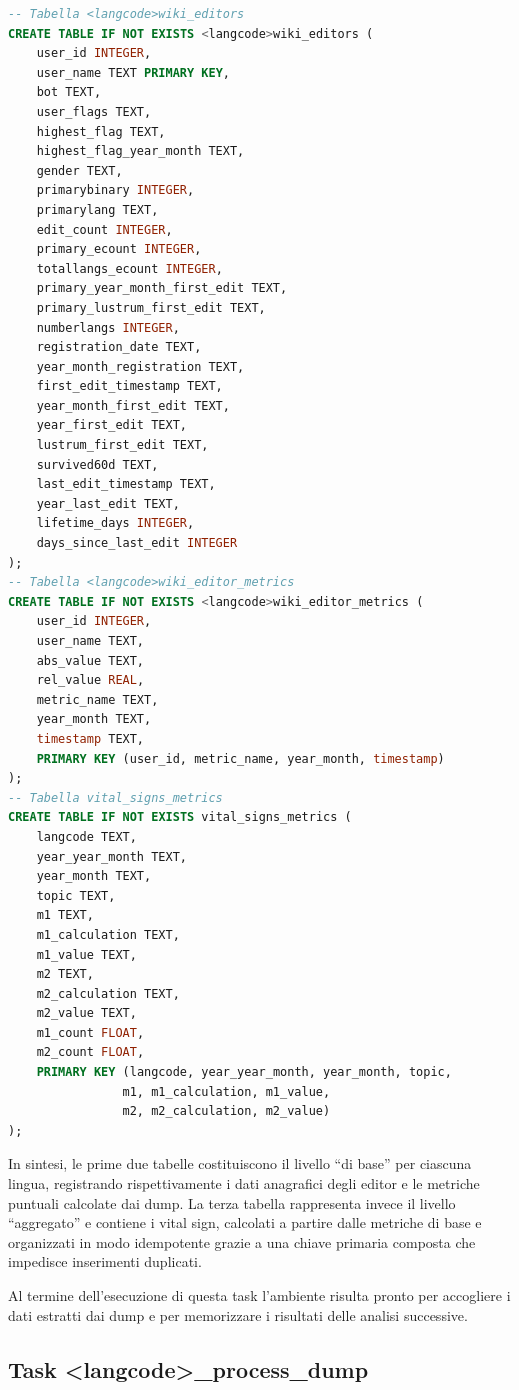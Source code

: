 \begin{lstlisting}[language=SQL, caption={Definizione delle tabelle create dalla task create\_dbs}, label=lst:create_dbs_tables, basicstyle=\scriptsize\ttfamily]
-- Tabella <langcode>wiki_editors
CREATE TABLE IF NOT EXISTS <langcode>wiki_editors (
    user_id INTEGER,
    user_name TEXT PRIMARY KEY,
    bot TEXT,
    user_flags TEXT,
    highest_flag TEXT,
    highest_flag_year_month TEXT,
    gender TEXT,
    primarybinary INTEGER,
    primarylang TEXT,
    edit_count INTEGER,
    primary_ecount INTEGER,
    totallangs_ecount INTEGER,
    primary_year_month_first_edit TEXT,
    primary_lustrum_first_edit TEXT,
    numberlangs INTEGER,
    registration_date TEXT,
    year_month_registration TEXT,
    first_edit_timestamp TEXT,
    year_month_first_edit TEXT,
    year_first_edit TEXT,
    lustrum_first_edit TEXT,
    survived60d TEXT,
    last_edit_timestamp TEXT,
    year_last_edit TEXT,
    lifetime_days INTEGER,
    days_since_last_edit INTEGER
);
-- Tabella <langcode>wiki_editor_metrics
CREATE TABLE IF NOT EXISTS <langcode>wiki_editor_metrics (
    user_id INTEGER,
    user_name TEXT,
    abs_value TEXT,
    rel_value REAL,
    metric_name TEXT,
    year_month TEXT,
    timestamp TEXT,
    PRIMARY KEY (user_id, metric_name, year_month, timestamp)
);
-- Tabella vital_signs_metrics
CREATE TABLE IF NOT EXISTS vital_signs_metrics (
    langcode TEXT,
    year_year_month TEXT,
    year_month TEXT,
    topic TEXT,
    m1 TEXT,
    m1_calculation TEXT,
    m1_value TEXT,
    m2 TEXT,
    m2_calculation TEXT,
    m2_value TEXT,
    m1_count FLOAT,
    m2_count FLOAT,
    PRIMARY KEY (langcode, year_year_month, year_month, topic, 
                m1, m1_calculation, m1_value, 
                m2, m2_calculation, m2_value)
);
\end{lstlisting}

In sintesi, le prime due tabelle costituiscono il livello “di base” per ciascuna lingua, registrando rispettivamente i dati anagrafici degli editor e le metriche puntuali calcolate dai dump. 
La terza tabella rappresenta invece il livello “aggregato” e contiene i vital sign, calcolati a partire dalle metriche di base e organizzati in modo idempotente grazie a una chiave primaria composta che impedisce inserimenti duplicati.  

Al termine dell’esecuzione di questa task l’ambiente risulta pronto per accogliere i dati estratti dai dump e per memorizzare i risultati delle analisi successive.

\subsection{Task \textless langcode\textgreater\_process\_dump}
\label{subsec:process_dump}

